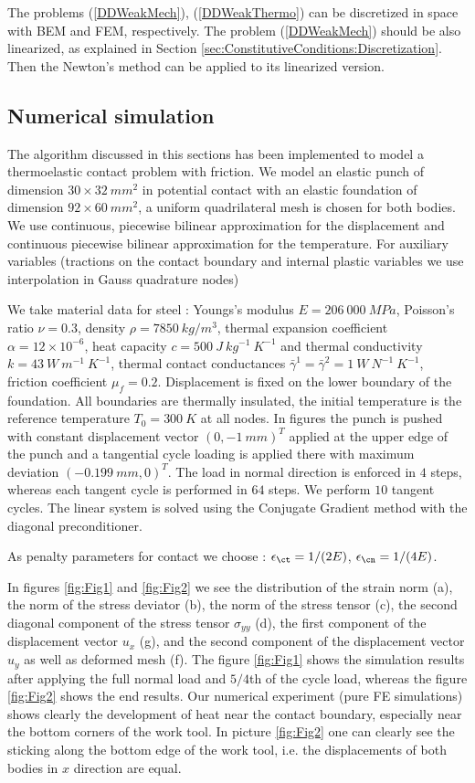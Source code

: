 The problems (\ref{DDWeakMech}), (\ref{DDWeakThermo}) can be discretized in space with BEM and FEM, respectively. The problem (\ref{DDWeakMech}) should be also linearized, as explained in Section \ref{sec:ConstitutiveConditions:Discretization}. Then the Newton's method can be applied to its linearized version.



\subsection{Numerical simulation}\label{sec:ThElContact:Benchmark}
The algorithm discussed in this sections has been implemented to model a thermoelastic contact problem with friction. We model an elastic punch of dimension $30\times 32~mm^2$ in potential contact with an elastic foundation of dimension $92\times60~mm^2$, a uniform quadrilateral mesh is chosen for both bodies. We use continuous, piecewise bilinear approximation for the displacement and continuous piecewise bilinear approximation for the temperature. For auxiliary variables (tractions on the contact boundary and internal plastic variables we use interpolation in Gauss quadrature nodes)

We take material data for steel \cite{JoKl93}: Youngs's modulus $E=206~000~MPa$, Poisson's ratio $\nu=0.3$, density $\rho=7850~kg/m^3$, thermal expansion coefficient $\alpha=12\times10^{-6}$, heat capacity $c=500~J~kg^{-1}~K^{-1}$ and thermal conductivity $k=43~W~m^{-1}~K^{-1}$, thermal contact conductances $\bar{\gamma}^1=\bar{\gamma}^2=1~W~N^{-1}~K^{-1}$, friction coefficient $\mu_f=0.2$. Displacement is fixed on the lower boundary of the foundation. All boundaries are thermally insulated, the initial temperature is the reference temperature $T_0=300~K$ at all nodes.  In figures the punch is pushed with constant displacement vector $(0,-1~mm)^T$ applied at the upper edge of the punch and  a tangential cycle loading  is applied there with maximum deviation $(-0.199~mm,0)^T$. The load in normal direction is enforced in $4$ steps, whereas each tangent cycle is performed in $64$ steps. We perform $10$ tangent cycles. The linear system is solved using the Conjugate Gradient method with the diagonal preconditioner. 

As penalty parameters for contact we choose : $\epsilon_{\ct}=1/(2E)$, $\epsilon_{\cn}=1/(4E)$.

In figures \ref{fig:Fig1} and \ref{fig:Fig2} we see the distribution of the strain norm (a), the norm of the stress deviator (b), the norm of the stress tensor (c), the second diagonal component of the stress tensor $\sigma_{yy}$ (d), the first component of the displacement vector $u_x$ (g),  and  the second component of the displacement vector $u_y$ as well as deformed mesh (f). The figure \ref{fig:Fig1} shows the simulation results after applying the full normal load and $5/4$th of the cycle load,  whereas the figure \ref{fig:Fig2} shows  the end results. Our numerical experiment (pure FE simulations) shows clearly the development of heat near the contact boundary, especially  near the bottom corners of the work tool. In picture \ref{fig:Fig2} one can clearly see the sticking along the bottom edge of the work tool, i.e. the displacements of both bodies in $x$ direction are equal.


